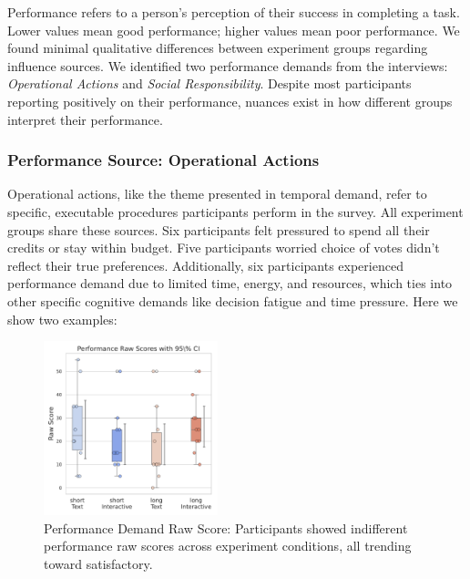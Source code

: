Performance refers to a person's perception of their success in completing a task. Lower values mean good performance; higher values mean poor performance. We found minimal qualitative differences between experiment groups regarding influence sources. We identified two performance demands from the interviews: \textit{Operational Actions} and \textit{Social Responsibility}. Despite most participants reporting positively on their performance, nuances exist in how different groups interpret their performance.

\subsubsection{Performance Source: Operational Actions}
Operational actions, like the theme presented in temporal demand, refer to specific, executable procedures participants perform in the survey. All experiment groups share these sources. Six participants felt pressured to spend all their credits or stay within budget. Five participants worried choice of votes didn't reflect their true preferences. Additionally, six participants experienced performance demand due to limited time, energy, and resources, which ties into other specific cognitive demands like decision fatigue and time pressure. Here we show two examples:

\begin{figure} %
    \centering
    \includegraphics[width=0.45\textwidth, trim=0 13 0 13, clip]{content/image/cog/Performance_scores.pdf}
    \captionsetup{width=0.40\textwidth, justification=justified} %
    \caption{Performance Demand Raw Score: Participants showed indifferent performance raw scores across experiment conditions, all trending toward satisfactory.}
    \label{fig:performance_cog_score}
\end{figure}

